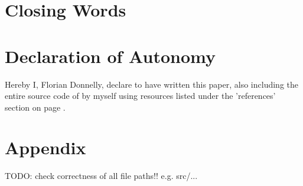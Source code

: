 \documentclass[12pt,a4paper,man]{apa7}
\begin{document}
\section{Closing Words}
\section{Declaration of Autonomy}
Hereby I, Florian Donnelly, declare to have written this paper, also including
the entire source code of \name by myself using resources listed under the
'references' section on page \pageref{bibliography}.

\section{Appendix}

\newpage\printbibliography[heading=bibintoc]\label{bibliography}

TODO: check correctness of all file paths!! e.g. src/...
\end{document}
